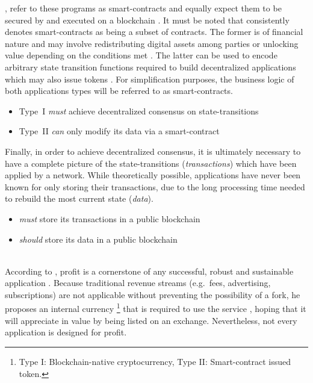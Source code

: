 \begin{description}[format={\storedescriptionlabel}]
	\citeauthor{Raval.2016}, \citeauthor{Antonopoulos.2018} refer to these programs as smart-contracts and equally expect them to be secured by and executed on a blockchain \cite[p.~13]{Raval.2016} \cite[pp.~23,~34]{Antonopoulos.2018}. It must be noted that \citeauthor{Buterin2014} consistently denotes smart-contracts as being a subset of contracts. The former is of financial nature and may involve redistributing digital assets among parties or unlocking value depending on the conditions met \cite[pp.~1,~13]{EthereumWhitepaper}. The latter can be used to encode arbitrary state transition functions required to build decentralized applications which may also issue tokens \cite[pp.~1,~19]{EthereumWhitepaper}. For simplification purposes, the business logic of both applications types will be referred to as smart-contracts. 	

	\begin{itemize}
  		\item Type~I \textit{must} achieve decentralized consensus on state-transitions
  		\item Type~II \textit{can} only modify its data via a smart-contract
	\end{itemize}

	Finally, in order to achieve decentralized consensus, it is ultimately necessary to have a complete picture of the state-transitions (\textit{transactions}) which have been applied by a network. While theoretically possible, applications have never been known for only storing their transactions, due to the long processing time needed to rebuild the most current state (\textit{data}). 
	
	\begin{itemize}
  		\item \textit{must} store its transactions in a public blockchain
  		\item \textit{should} store its data in a public blockchain
	\end{itemize}

	\item[Internal currency]
	\hfill \\
	According to \citeauthor{Raval.2016}, profit is a cornerstone of any successful, robust and sustainable application \cite[p.~9]{Raval.2016}. Because traditional revenue streams (e.g.~fees, advertising, subscriptions) are not applicable without preventing the possibility of a fork, he proposes an internal currency \footnote{Type I: Blockchain-native cryptocurrency, Type II: Smart-contract issued token.} that is required to use the service \cite[p.~11]{Raval.2016}, hoping that it will appreciate in value by being listed on an exchange. Nevertheless, not every application is designed for profit.
	

\end{description}
